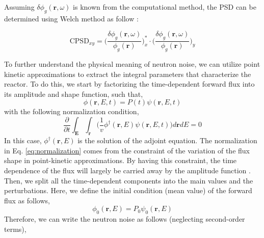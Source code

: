 Assuming $\delta \phi_g (\textbf{r},\omega)$ is known from the computational method, the PSD can be determined using Welch method as follow \cite{mylonakisCORESIMSimulations2021}:

\begin{equation}
        \text{CPSD}_{xy} = \biggl(\frac{\delta \phi_{g}(\textbf{r}, \omega)}{\phi_{g}(\textbf{r})} \biggr)_x^* \cdot \biggl(\frac{\delta \phi_{g}(\textbf{r}, \omega)}{\phi_{g}(\textbf{r})} \biggr)_y
        \label{eq:CPSD_comp}
\end{equation}

To further understand the physical meaning of neutron noise, we can utilize point kinetic approximations to extract the integral parameters that characterize the reactor. To do this, we start by factorizing the time-dependent forward flux into its amplitude and shape function, such that,
\begin{equation}
        \phi (\textbf{r}, E, t) = P(t) \psi (\textbf{r}, E, t)
\end{equation}
with the following normalization condition,
\begin{equation}\label{eq:normalization}
        \frac{\partial}{\partial t} \int_{\textbf{E}} \int_{\textbf{r}} \biggl( \frac{1}{v} \phi^{\dagger}(\textbf{r}, E) \psi (\textbf{r}, E, t) \biggr) d\textbf{r} dE = 0
\end{equation}
In this case, $\phi^{\dagger}(\textbf{r}, E)$ is the solution of the adjoint equation. The normalization in Eq. \ref{eq:normalization} comes from the constraint of the variation of the flux shape in point-kinetic approximations. By having this constraint, the time dependence of the flux will largely be carried away by the amplitude function \cite{ottIntroductoryNuclearReactor1985}. Then, we split all the time-dependent components into the main values and the perturbations. Here, we define the initial condition (mean value) of the forward flux as follows,
\begin{equation}
        \phi_0(\textbf{r}, E) = P_0 \psi_0 (\textbf{r}, E)
\end{equation}
Therefore, we can write the neutron noise as follows (neglecting second-order terms),

